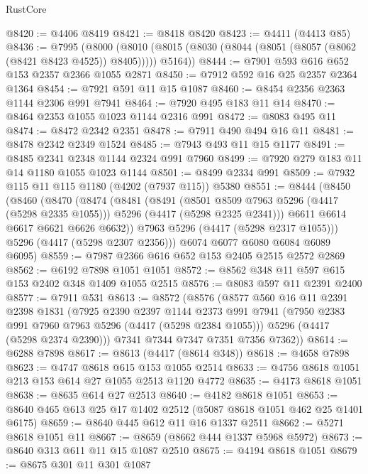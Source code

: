 \begin{lexlean}{RustCore}
\begin{coremodule}
@8420 := @4406 @8419
@8421 := @8418 @8420
@8423 := @4411 (@4413 @85)
@8436 := @7995
    (@8000 (@8010 (@8015 (@8030 (@8044 (@8051 (@8057 (@8062 (@8421 @8423 @4525)) @8405))))) @5164))
@8444 := @7901 @593 @616 @652 @153 @2357 @2366 @1055 @2871
@8450 := @7912 @592 @16 @25 @2357 @2364 @1364
@8454 := @7921 @591 @11 @15 @1087
@8460 := @8454 @2356 @2363 @1144 @2306 @991 @7941
@8464 := @7920 @495 @183 @11 @14
@8470 := @8464 @2353 @1055 @1023 @1144 @2316 @991
@8472 := @8083 @495 @11
@8474 := @8472 @2342 @2351
@8478 := @7911 @490 @494 @16 @11
@8481 := @8478 @2342 @2349 @1524
@8485 := @7943 @493 @11 @15 @1177
@8491 := @8485 @2341 @2348 @1144 @2324 @991 @7960
@8499 := @7920 @279 @183 @11 @14 @1180 @1055 @1023 @1144
@8501 := @8499 @2334 @991
@8509 := @7932 @115 @11 @115 @1180 (@4202 (@7937 @115)) @5380
@8551 := @8444
    (@8450
      (@8460
        (@8470
          (@8474
            (@8481
              (@8491
                (@8501 @8509 @7963 @5296 (@4417 (@5298 @2335 @1055)))
                @5296
                (@4417 (@5298 @2325 @2341)))
              @6611
              @6614
              @6617
              @6621
              @6626
              @6632))
          @7963
          @5296
          (@4417 (@5298 @2317 @1055)))
        @5296
        (@4417 (@5298 @2307 @2356)))
      @6074
      @6077
      @6080
      @6084
      @6089
      @6095)
@8559 := @7987 @2366 @616 @652 @153 @2405 @2515 @2572 @2869
@8562 := @6192 @7898 @1051 @1051
@8572 := @8562 @348 @11 @597 @615 @153 @2402 @348 @1409 @1055 @2515
@8576 := @8083 @597 @11 @2391 @2400
@8577 := @7911 @531
@8613 := @8572
    (@8576
      (@8577
        @560
        @16
        @11
        @2391
        @2398
        @1831
        (@7925
          @2390
          @2397
          @1144
          @2373
          @991
          @7941
          (@7950 @2383 @991 @7960 @7963 @5296 (@4417 (@5298 @2384 @1055)))
          @5296
          (@4417 (@5298 @2374 @2390)))
        @7341
        @7344
        @7347
        @7351
        @7356
        @7362))
@8614 := @6288 @7898
@8617 := @8613 (@4417 (@8614 @348))
@8618 := @4658 @7898
@8623 := @4747 @8618 @615 @153 @1055 @2514
@8633 := @4756 @8618 @1051 @213 @153 @614 @27 @1055 @2513 @1120 @4772
@8635 := @4173 @8618 @1051
@8638 := @8635 @614 @27 @2513
@8640 := @4182 @8618 @1051
@8653 := @8640 @465 @613 @25 @17 @1402 @2512 (@5087 @8618 @1051 @462 @25 @1401 @6175)
@8659 := @8640 @445 @612 @11 @16 @1337 @2511
@8662 := @5271 @8618 @1051 @11
@8667 := @8659 (@8662 @444 @1337 @5968 @5972)
@8673 := @8640 @313 @611 @11 @15 @1087 @2510
@8675 := @4194 @8618 @1051
@8679 := @8675 @301 @11 @301 @1087

\end{coremodule}
\end{lexlean}

